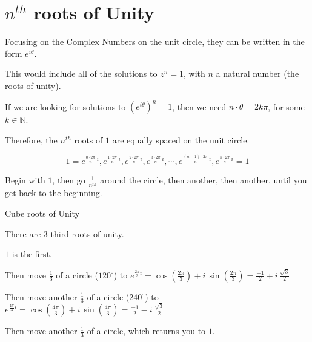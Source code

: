 \documentclass{ximera}
\begin{document}
\section*{$n^{th}$ roots of Unity}


Focusing on the Complex Numbers on the unit circle, they can be written in the form $e^{i \theta}$.


This would include all of the solutions to $z^n = 1$, with $n$ a natural number (the roots of unity).




If we are looking for solutions to $(e^{i \theta})^n = 1$, then we need $n \cdot \theta = 2k\pi$, for some $k \in \mathbb{N}$.


Therefore, the $n^{th}$ roots of $1$ are equally spaced on the unit circle.  



\[
1=e^{\tfrac{0\cdot2\pi}{n}\,i}, e^{\tfrac{1\cdot2\pi}{n}\,i}, e^{\tfrac{2\cdot2\pi}{n}\,i}, e^{\tfrac{3\cdot2\pi}{n}\,i}, \cdots, e^{\tfrac{(n-1)\cdot2\pi}{n}\,i}, e^{\tfrac{n\cdot2\pi}{n}\,i}=1
\]



Begin with $1$, then go $\frac{1}{n^{th}}$ around the circle, then another, then another, until you get back to the beginning.




\begin{example}  Cube roots of Unity

There are $3$ third roots of unity.

$1$ is the first.

Then move $\frac{1}{3}$ of a circle ($120^{\circ}$) to $e^{\tfrac{2 \pi}{3} i} = \cos\left(\frac{2 \pi}{3}\right) + i \, \sin\left(\frac{2 \pi}{3}\right) = \frac{-1}{2} + i \, \frac{\sqrt{3}}{2}$

Then move another $\frac{1}{3}$ of a circle ($240^{\circ}$) to $e^{\tfrac{4 \pi}{3} i} = \cos\left(\frac{4 \pi}{3}\right) + i \, \sin\left(\frac{4 \pi}{3}\right) = \frac{-1}{2} - i \, \frac{\sqrt{3}}{2}$



Then move another $\frac{1}{3}$ of a circle, which returns you to $1$.




\end{example}
\end{document}
